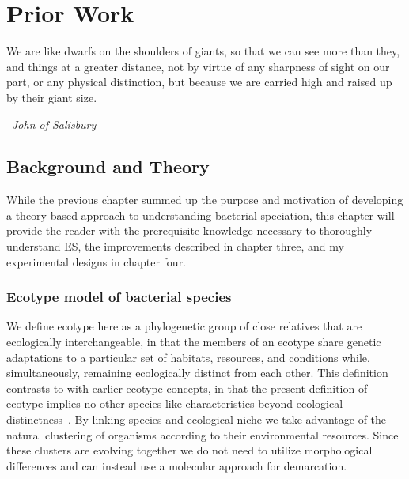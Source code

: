 \gobbletocpage
\chapter{Prior Work}
\restoretocpage


\begin{shadequote}
We are like dwarfs on the shoulders of giants, so that we can see more than they, and things at a greater distance, not by virtue of any sharpness of sight on our part, or any physical distinction, but because we are carried high and raised up by their giant size.\par--\emph{John of Salisbury}
\end{shadequote}

\section{Background and Theory}
While the previous chapter summed up the purpose and motivation of developing a theory-based approach to understanding bacterial speciation, this chapter will provide the reader with the prerequisite knowledge necessary to thoroughly understand ES, the improvements described in chapter three, and my experimental designs in chapter four.

\subsection*{Ecotype model of bacterial species}
We define ecotype here as a phylogenetic group of close relatives that are ecologically interchangeable, in that the members of an ecotype share genetic adaptations to a particular set of habitats, resources, and conditions while, simultaneously, remaining ecologically distinct from each other.%
This definition contrasts to with earlier ecotype concepts, in that the present definition of ecotype implies no other species-like characteristics beyond ecological distinctness~\cite{wiedenbeckHGT}.
By linking species and ecological niche we take advantage of the natural clustering of organisms according to their environmental resources.
Since these clusters are evolving together we do not need to utilize morphological differences and can instead use a molecular approach for demarcation.

